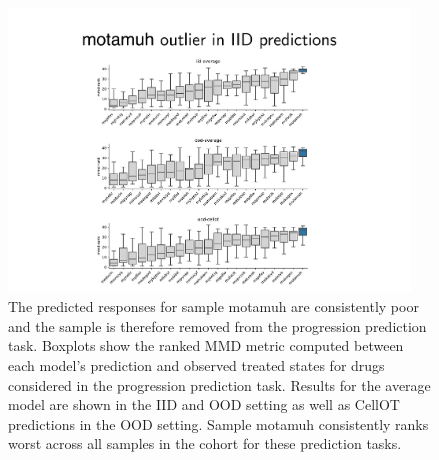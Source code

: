 \begin{figure}
  \begin{center}
    \includegraphics[width=0.95\textwidth]{figures/cellot-cohort/progression-exclude-motamuh.pdf}
  \end{center}
  \caption{
    The predicted responses for sample motamuh are consistently poor and the sample is therefore removed from the progression prediction task.
    Boxplots show the ranked MMD metric computed between each model's prediction and observed treated states for drugs considered in the progression prediction task.
    Results for the average model are shown in the IID and OOD setting as well as CellOT predictions in the OOD setting.
    Sample motamuh consistently ranks worst across all samples in the cohort for these prediction tasks.
  }\label{fig:progression-exclude-motamuh}
\end{figure}
